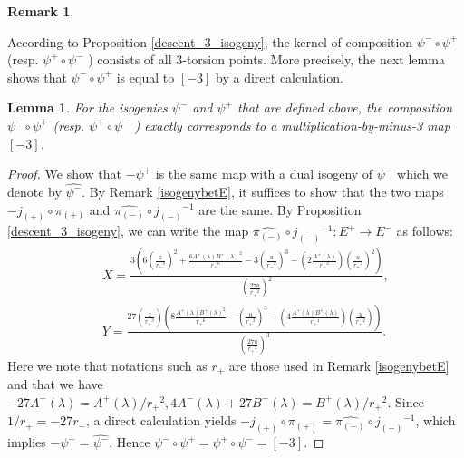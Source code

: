 \documentclass[a4paper, 11pt]{article}
\newtheorem{rem}[defn]{Remark}
\theoremstyle{plain}
\newtheorem{lem}[defn]{Lemma}
\newcommand{\?}{\textcolor{red}{??}}
\newcommand{\lm}{\lambda}
\begin{document}
\begin{rem}

\end{rem}
According to Proposition \ref{descent_3_isogeny}, the kernel of composition $\psi^{-} \circ {\psi}^{+} $ (resp. ${\psi}^{+} \circ \psi^{-} $ ) consists of all $3$-torsion points. More precisely, the next lemma shows that $\psi^{-} \circ {\psi}^{+} $ is equal to $[-3]$ by a direct calculation. 

\begin{lem}
\label{minus-3}
    For the isogenies $\psi^{-}$ and ${\psi}^{+}$ that are defined above, the composition $\psi^{-} \circ {\psi}^{+} $ (resp. ${\psi}^{+} \circ \psi^{-} $ ) exactly corresponds to a multiplication-by-minus-3 map $[-3]$.
\end{lem}
\begin{proof}
    We show that $-{\psi}^{+}$ is the same map with a dual isogeny of $\psi^{-}$ which we denote by $\hat{\psi^{-}}$. By Remark \ref{isogenybetE}, it suffices to show that the two maps $-j_{(+)}\circ\pi_{(+)}$ and $\hat{\pi_{(-)}}\circ{j_{(-)}}^{-1}$ are the same. By Proposition \ref{descent_3_isogeny}, we can write the map $\hat{\pi_{(-)}}\circ {j_{(-)}}^{-1}:E^{+} \rightarrow E^{-}$ as follows:
    \begin{align*}
       && X=\frac{3\left(6\left(\frac{z}{{r_{+}}^3}\right)^2+\frac{6A^{+}(\lm)B^{+}(\lm)^2}{{r_{+}}^6}-3\left(\frac{u}{{r_+}^2}\right)^3-\left(2\frac{A^{+}(\lm)}{{r_+}^2}\right) \left(\frac{u}{{r_+}^2}\right)^2\right)}{\left(\frac{27u}{{r_+}^2}\right)^2},\\ && Y=\frac{27\left(\frac{z}{{r_+}^3}\right)\left(8\frac{A^{+}(\lm)B^{+}(\lm)^2}{{r_+}^6}-\left(\frac{u}{{r_+}^2}\right)^3-\left(4\frac{A^{+}(\lm)B^{+}(\lm)}{{r_+}^4}\right)\left(\frac{u}{{r_+}^2}\right)\right)}{\left(\frac{27u}{{r_+}^2}\right)^3}.
    \end{align*}
    Here we note that notations such as $r_+$ are those used in Remark \ref{isogenybetE} and that we have  $-27A^{-}(\lm)=A^{+}(\lm)/{r_+}^2,4A^{-}(\lm)+27B^{-}(\lm)=B^{+}(\lm)/{r_+}^2$. Since $1/r_+=-27r_{-}$, a direct calculation yields $-j_{(+)}\circ\pi_{(+)}=\hat{\pi_{(-)}}\circ{j_{(-)}}^{-1}$, which implies $-\psi^{+}=\hat{\psi^{-}}$. Hence $\psi^{-} \circ {\psi}^+={\psi}^+ \circ \psi^{-}=[-3]$.
\end{proof}
\end{document}
